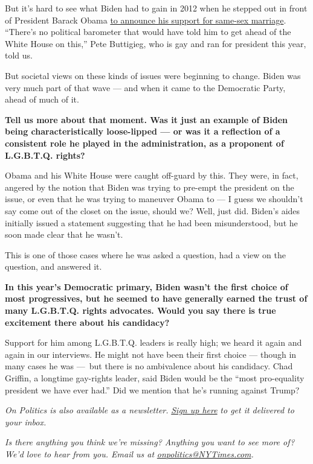 But it's hard to see what Biden had to gain in 2012 when he stepped out
in front of President Barack Obama
\href{https://www.nytimes3xbfgragh.onion/2012/05/07/us/politics/biden-expresses-support-for-same-sex-marriages.html}{to
announce his support for same-sex marriage}. ``There's no political
barometer that would have told him to get ahead of the White House on
this,'' Pete Buttigieg, who is gay and ran for president this year, told
us.

But societal views on these kinds of issues were beginning to change.
Biden was very much part of that wave --- and when it came to the
Democratic Party, ahead of much of it.

\textbf{Tell us more about that moment. Was it just an example of Biden
being characteristically loose-lipped --- or was it a reflection of a
consistent role he played in the administration, as a proponent of
L.G.B.T.Q. rights?}

Obama and his White House were caught off-guard by this. They were, in
fact, angered by the notion that Biden was trying to pre-empt the
president on the issue, or even that he was trying to maneuver Obama to
--- I guess we shouldn't say come out of the closet on the issue, should
we? Well, just did. Biden's aides initially issued a statement
suggesting that he had been misunderstood, but he soon made clear that
he wasn't.

This is one of those cases where he was asked a question, had a view on
the question, and answered it.

\textbf{In this year's Democratic primary, Biden wasn't the first choice
of most progressives, but he seemed to have generally earned the trust
of many L.G.B.T.Q. rights advocates. Would you say there is true
excitement there about his candidacy?}

Support for him among L.G.B.T.Q. leaders is really high; we heard it
again and again in our interviews. He might not have been their first
choice --- though in many cases he was ---~but there is no ambivalence
about his candidacy. Chad Griffin, a longtime gay-rights leader, said
Biden would be the ``most pro-equality president we have ever had.'' Did
we mention that he's running against Trump?

\emph{On Politics is also available as a newsletter.}
\href{https://www.nytimes3xbfgragh.onion/newsletters/politics}{\emph{Sign
up here}} \emph{to get it delivered to your inbox.}

\emph{Is there anything you think we're missing? Anything you want to
see more of? We'd love to hear from you. Email us at}
\href{mailto:onpolitics@NYTimes.com}{\emph{onpolitics@NYTimes.com}}\emph{.}

